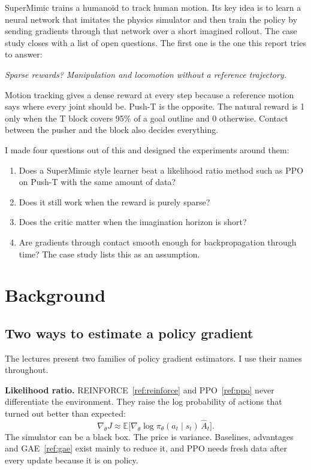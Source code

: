 \documentclass[11pt,a4paper]{article}
\renewcommand{\cite}[1]{\ref{ref:#1}}
\begin{document}
SuperMimic trains a humanoid to track human motion. Its key idea is to learn a neural network that
imitates the physics simulator and then train the policy by sending gradients through that network
over a short imagined rollout. The case study closes with a list of open questions. The first one
is the one this report tries to answer:

\begin{notebox}
\emph{Sparse rewards? Manipulation and locomotion without a reference trajectory.}

Motion tracking gives a dense reward at every step because a reference motion says where every joint
should be. Push-T is the opposite. The natural reward is 1 only when the T block covers 95\% of a
goal outline and 0 otherwise. Contact between the pusher and the block also decides everything.
\end{notebox}

I made four questions out of this and designed the experiments around them:
\begin{enumerate}
  \item Does a SuperMimic style learner beat a likelihood ratio method such as PPO on Push-T with
        the same amount of data?
  \item Does it still work when the reward is purely sparse?
  \item Does the critic matter when the imagination horizon is short?
  \item Are gradients through contact smooth enough for backpropagation through time? The case study
        lists this as an assumption.
\end{enumerate}

\section{Background}
\label{sec:background}

\subsection{Two ways to estimate a policy gradient}

The lectures present two families of policy gradient estimators. I use their names throughout.

\textbf{Likelihood ratio.} REINFORCE~\cite{reinforce} and PPO~\cite{ppo} never differentiate
the environment. They raise the log probability of actions that turned out better than expected:
\begin{equation}
  \nabla_\theta J \approx \mathbb{E}\big[\nabla_\theta \log \pi_\theta(a_t \mid s_t)\, \hat{A}_t\big].
\end{equation}
The simulator can be a black box. The price is variance. Baselines, advantages and
GAE~\cite{gae} exist mainly to reduce it, and PPO needs fresh data after every update because it
is on policy.
\end{document}
